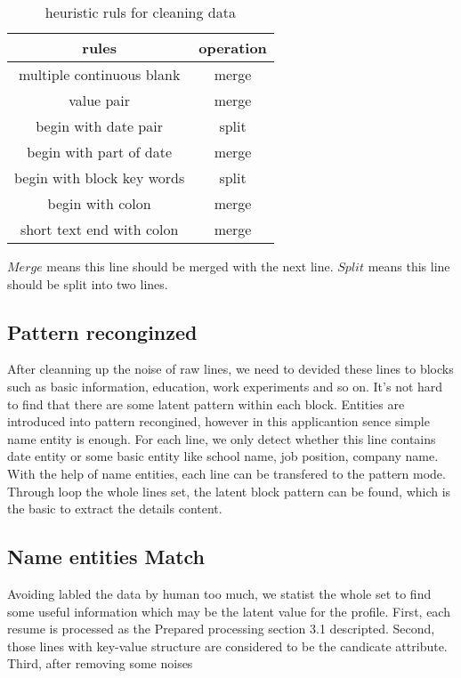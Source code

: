 \documentclass{acm_proc_article-sp}
\begin{document}
\begin{table}
\centering
\caption{heuristic ruls for cleaning data}
\begin{tabular}{|c|c|} \hline
rules & operation\\ \hline
multiple continuous blank & merge \\ \hline
value pair & merge \\ \hline
begin with date pair & split\\ \hline
begin with part of date & merge \\ \hline
begin with block key words & split \\ \hline
begin with colon & merge\\ \hline
short text end with colon & merge \\
\hline\end{tabular}
\end{table}

$Merge$ means this line should be merged with the next line. $Split$ means this line should be split into two lines.

\subsection{Pattern reconginzed}

After cleanning up the noise of raw lines, we need to devided these lines to blocks such as basic information, education, work experiments and so on. 
It's not hard to find that there are some latent pattern within each block.
Entities are introduced into pattern recongined, however in this applicantion sence simple name entity is enough.
For each line, we only detect whether this line contains date entity or some basic entity like school name, job position, company name.
With the help of name entities, each line can be transfered to the pattern mode.
Through loop the whole lines set, the latent block pattern can be found, which is the basic to extract the details content.


\subsection{Name entities Match}

Avoiding labled the data by human too much, we statist the whole set to find some useful information which may be the latent value for the profile.
First, each resume is processed as the Prepared processing section 3.1 descripted.
Second, those lines with key-value structure are considered to be the candicate attribute.
Third, after removing some noises
\end{document}

